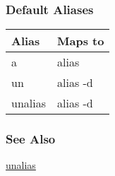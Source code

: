 \subsubsection*{Default Aliases}
\begin{tabular}{|l|l|}
\hline 
 Alias  & Maps to  \\
 \hline 
 a  & alias  \\
 \hline 
 un  & alias -d  \\
 \hline 
 unalias  & alias -d  \\
 \hline 
\end{tabular}
\subsubsection*{See Also}
\hyperref[unalias]{unalias} 